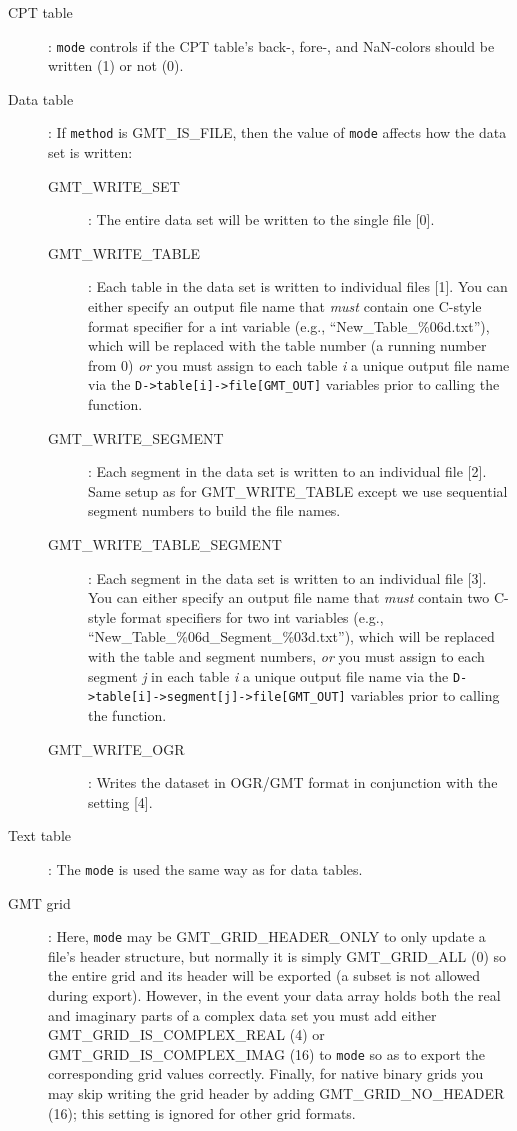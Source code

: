 \documentclass[11pt]{report}
\begin{document}
\begin{description}
\item [CPT table]: \texttt{mode} controls if the CPT table's back-, fore-, and NaN-colors
should be written (1) or not (0).
\item [Data table]: If \texttt{method} is GMT\_IS\_FILE, then the value of
\texttt{mode} affects how the data set is written:
\begin{description}
\item [GMT\_WRITE\_SET]: The entire data set will be written to the single file [0].
\item [GMT\_WRITE\_TABLE]: Each table in the data set is written to individual files [1].
You can either specify an output file name that \emph{must} contain one C-style
format specifier for a int variable (e.g., ``New\_Table\_\%06d.txt''), which will be
replaced with the table number (a running number from 0) \emph{or} you must assign
to each table \emph{i} a unique output file name via the \texttt{D->table[i]->file[GMT\_OUT]}
variables prior to calling the function.
\item [GMT\_WRITE\_SEGMENT]: Each segment in the data set is written to an individual file [2].
Same setup as for GMT\_WRITE\_TABLE except we use sequential segment numbers to build the file names.
\item [GMT\_WRITE\_TABLE\_SEGMENT]: Each segment in the data set is written to an individual file [3].
You can either specify an output file name that \emph{must} contain two C-style
format specifiers for two int variables (e.g., ``New\_Table\_\%06d\_Segment\_\%03d.txt''),
which will be replaced with the table and segment numbers, \emph{or}
you must assign to each segment \emph{j} in each table \emph{i} a unique output file name
via the \texttt{D->table[i]->segment[j]->file[GMT\_OUT]} variables prior to calling the function.
\item [GMT\_WRITE\_OGR]: Writes the dataset in OGR/GMT format in conjunction with the  setting [4].
\end{description}
\item [Text table]: The \texttt{mode} is used the same way as for data tables.
\item [GMT grid]: Here, \texttt{mode} may be GMT\_GRID\_HEADER\_ONLY to only update a file's header
structure, but normally it is simply GMT\_GRID\_ALL (0) so the entire
grid and its header will be exported (a subset is not allowed during export).
However, in the event your data array holds both the real and imaginary parts of a
complex data set you must add either GMT\_GRID\_IS\_COMPLEX\_REAL (4) or GMT\_GRID\_IS\_COMPLEX\_IMAG (16) to \texttt{mode}
so as to export the corresponding grid values correctly.  Finally, for native binary grids you may skip writing
the grid header by adding GMT\_GRID\_NO\_HEADER (16); this setting is ignored for other grid formats.
\end{description}
\end{document}
